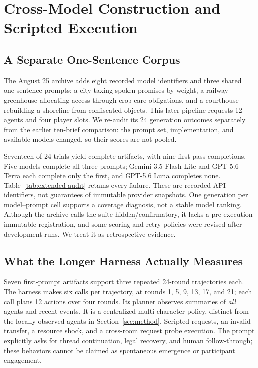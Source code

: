 \section{Cross-Model Construction and Scripted Execution}
\label{sec:extended}

\subsection{A Separate One-Sentence Corpus}
The August 25 archive adds eight recorded model identifiers and three shared
one-sentence prompts: a city taxing spoken promises by weight, a railway
greenhouse allocating access through crop-care obligations, and a courthouse
rebuilding a shoreline from confiscated objects. This later pipeline requests
12 agents and four player slots. We re-audit its 24 generation outcomes
separately from the earlier ten-brief comparison: the prompt set, implementation,
and available models changed, so their scores are not pooled.

Seventeen of 24 trials yield complete artifacts, with nine first-pass
completions. Five models complete all three prompts; Gemini 3.5 Flash Lite
and GPT-5.6 Terra each complete only the first, and GPT-5.6 Luna completes none.
Table~\ref{tab:extended-audit} retains every failure. These are recorded API
identifiers, not guarantees of immutable provider snapshots. One generation
per model--prompt cell supports a coverage diagnosis, not a stable model ranking.
Although the archive calls the suite hidden/confirmatory, it lacks a
pre-execution immutable registration, and some scoring and retry policies
were revised after development runs. We treat it as retrospective evidence.

\subsection{What the Longer Harness Actually Measures}
Seven first-prompt artifacts support three repeated 24-round trajectories
each. The harness makes six calls per trajectory, at rounds 1, 5, 9, 13, 17,
and 21; each call plans 12 actions over four rounds. Its planner observes
summaries of \emph{all} agents and recent events. It is a centralized
multi-character policy, distinct from the locally observed agents in
Section~\ref{sec:method}. Scripted requests, an invalid transfer, a resource
shock, and a cross-room request probe execution. The prompt explicitly asks
for thread continuation, legal recovery, and human follow-through; these
behaviors cannot be claimed as spontaneous emergence or participant engagement.

